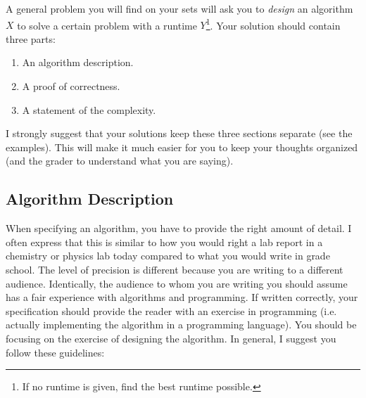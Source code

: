 \documentclass[10pt]{article}
\theoremstyle{plain}
\theoremstyle{definition}
\numberwithin{equation}{section}
\numberwithin{figure}{section}
\begin{document}
\noindent A general problem you will find on your sets will ask you to \emph{design} an algorithm $X$ to solve a certain problem with a runtime $Y$\footnote{If no runtime is given, find the best runtime possible.}. Your solution should contain three parts:
\begin{enumerate}
\item An algorithm description.
\item A proof of correctness.
\item A statement of the complexity.
\end{enumerate}
I strongly suggest that your solutions keep these three sections separate (see the examples). This will make it much easier for you to keep your thoughts organized (and the grader to understand what you are saying).

\subsection{Algorithm Description}
When specifying an algorithm, you have to provide the right amount of detail. I often express that this is similar to how you would right a lab report in a chemistry or physics lab today compared to what you would write in grade school. The level of precision is different because you are writing to a different audience. Identically, the audience to whom you are writing you should assume has a fair experience with algorithms and programming. If written correctly, your specification should provide the reader with an exercise in programming (i.e. actually implementing the algorithm in a programming language). You should be focusing on the exercise of designing the algorithm. In general, I suggest you follow these guidelines:
\end{document}
